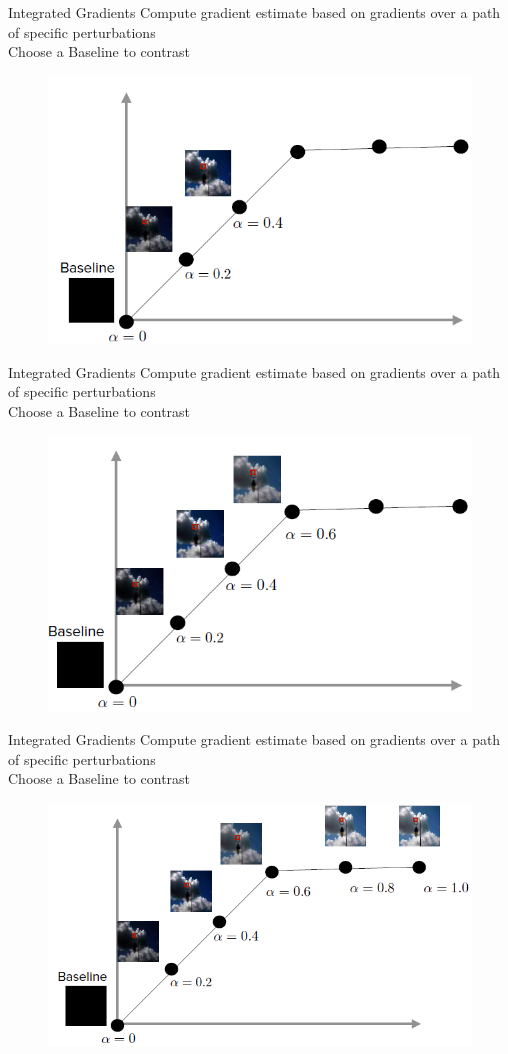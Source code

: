 \documentclass[11pt,compress,t,notes=noshow, aspectratio=169, xcolor=table]{beamer}
\begin{document}
\begin{frame}{Integrated Gradients}
    Compute gradient estimate based on gradients over a path of specific perturbations\\
    Choose a Baseline to contrast %
    \begin{figure}
    \bigskip
    \bigskip
       \includegraphics[width=0.6\linewidth]{bild31}
    \end{figure}
\end{frame}


\begin{frame}{Integrated Gradients}
    Compute gradient estimate based on gradients over a path of specific perturbations\\
    Choose a Baseline to contrast %
    \begin{figure}
    \bigskip
    \bigskip
       \includegraphics[width=0.6\linewidth]{bild32}
    \end{figure}
\end{frame}

\begin{frame}{Integrated Gradients}
    Compute gradient estimate based on gradients over a path of specific perturbations\\
    Choose a Baseline to contrast %
    \begin{figure}
    \bigskip
    \bigskip
       \includegraphics[width=0.6\linewidth]{bild33}
    \end{figure}
\end{frame}
\end{document}
